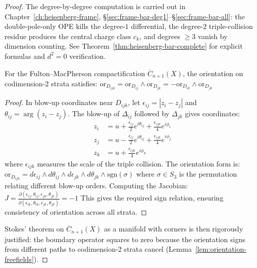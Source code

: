 \begin{proof}
The degree-by-degree computation is carried out in
Chapter~\ref{ch:heisenberg-frame}, \S\ref{sec:frame-bar-deg1}--\S\ref{sec:frame-bar-all}:
the double-pole-only OPE kills the degree-$1$ differential,
the degree-$2$ triple-collision residue produces the central charge
class $c_k$, and degrees $\geq 3$ vanish by dimension counting.
See Theorem~\ref{thm:heisenberg-bar-complete} for explicit formulas
and $d^2 = 0$ verification.

\begin{lemma}\label{lem:orientation-freefields}
For the Fulton--MacPherson compactification $\overline{C}_{n+1}(X)$, the orientation on codimension-2 strata satisfies:
$\text{or}_{D_{ijk}} = \text{or}_{D_{ij}} \wedge \text{or}_{D_{jk}} = -\text{or}_{D_{ik}} \wedge \text{or}_{D_{jk}}$
\end{lemma}

\begin{proof}
In blow-up coordinates near $D_{ijk}$, let $\epsilon_{ij} = |z_i - z_j|$ and $\theta_{ij} = \arg(z_i - z_j)$. The blow-up of $\Delta_{ij}$ followed by $\Delta_{jk}$ gives coordinates:
\begin{align}
z_i &= u + \frac{\epsilon_{ij}}{2}e^{i\theta_{ij}} + \frac{\epsilon_{ijk}}{4}e^{i\phi_i}\\
z_j &= u - \frac{\epsilon_{ij}}{2}e^{i\theta_{ij}} + \frac{\epsilon_{ijk}}{4}e^{i\phi_j}\\
z_k &= u + \frac{\epsilon_{ijk}}{4}e^{i\phi_k}
\end{align}
where $\epsilon_{ijk}$ measures the scale of the triple collision. The orientation form is:
$\text{or}_{D_{ijk}} = d\epsilon_{ij} \wedge d\theta_{ij} \wedge d\epsilon_{jk} \wedge d\theta_{jk} \wedge \text{sgn}(\sigma)$
where $\sigma \in S_3$ is the permutation relating different blow-up orders. Computing the Jacobian:
$J = \frac{\partial(\epsilon_{ij}, \theta_{ij}, \epsilon_{jk}, \theta_{jk})}{\partial(\epsilon_{ik}, \theta_{ik}, \epsilon_{jk}, \theta_{jk})} = -1$
This gives the required sign relation, ensuring consistency of orientation across all strata.
\end{proof}

Stokes' theorem on $\overline{C}_{n+1}(X)$ as a manifold with corners is then rigorously justified: the boundary operator squares to zero because the orientation signs from different paths to codimension-2 strata cancel (Lemma~\ref{lem:orientation-freefields}).
\end{proof}
 
